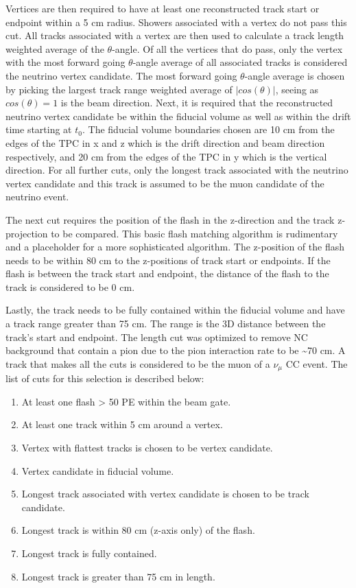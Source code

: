 Vertices are then required to have at least one reconstructed track start or endpoint within a 5 cm radius. Showers associated with a vertex do not pass this cut. All tracks associated with a vertex are then used to calculate a track length weighted average of the $\theta$-angle. Of all the vertices that do pass, only the vertex with the most forward going $\theta$-angle average of all associated tracks is considered the neutrino vertex candidate. The most forward going $\theta$-angle average is chosen by picking the largest track range weighted average of $|cos(\theta)|$, seeing as $cos(\theta)=1$ is the beam direction. Next, it is required that the reconstructed neutrino vertex candidate be within the fiducial volume as well as within the drift time starting at $t_0$. The fiducial volume boundaries chosen are 10 cm from the edges of the TPC in x and z which is the drift direction and beam direction respectively, and 20 cm from the edges of the TPC in y which is the vertical direction. For all further cuts, only the longest track associated with the neutrino vertex candidate and this track is assumed to be the muon candidate of the neutrino event.

The next cut requires the position of the flash in the z-direction and the track z-projection to be compared. This basic flash matching algorithm is rudimentary and a placeholder for a more sophisticated algorithm. The z-position of the flash needs to be within 80 cm to the z-positions of track start or endpoints. If the flash is between the track start and endpoint, the distance of the flash to the track is considered to be 0 cm. 

Lastly, the track needs to be fully contained within the fiducial volume and have a track range greater than 75 cm. The range is the 3D distance between the track's start and endpoint. The length cut was optimized to remove NC background that contain a pion due to the pion interaction rate to be \sim 70 cm. A track that makes all the cuts is considered to be the muon of a $\nu_{\mu}$ CC event. The list of cuts for this selection is described below:
\begin{enumerate}
\item At least one flash > 50 PE within the beam gate.
\item At least one track within 5 cm around a vertex.
\item Vertex with flattest tracks is chosen to be vertex candidate.
\item Vertex candidate in fiducial volume.
\item Longest track associated with vertex candidate is chosen to be track candidate.
\item Longest track is within 80 cm (z-axis only) of the flash.
\item Longest track is fully contained.
\item Longest track is greater than 75 cm in length.
\end{enumerate}

